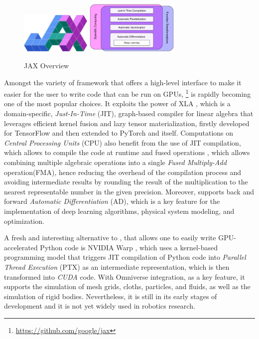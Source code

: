 \begin{figure}[h]
    \centering
    \caption{JAX Overview}
    \label{fig:jax_logo}
    \includegraphics[width=0.3\textwidth]{Images/jax_logo.png} \qquad \qquad
    \includegraphics[width=0.4\textwidth]{Images/JAX-overview.png}
\end{figure}

Amongst the variety of framework that offers a high-level interface to make it easier for the user to write code that can be run on \ac{GPU}s, \jax \footnote{\url{https://github.com/google/jax}} \citep{bradbury_jax_2018,47008} is rapidly becoming one of the most popular choices. It exploits the power of \ac{XLA} \citep{50530}, which is a domain-specific, \textit{Just-In-Time} (\ac{JIT}), graph-based compiler for linear algebra that leverages efficient kernel fusion and lazy tensor materialization, firstly developed for TensorFlow \citep{tensorflow2015-whitepaper} and then extended to PyTorch and \jax itself.
Computations on \textit{Central Processing Units} (\ac{CPU}) also benefit from the use of \ac{JIT} compilation, which allows to compile the code at runtime and fused operations \citep{wang_kernel_2010,snider_operator_2023}, which allows combining multiple algebraic operations into a single \textit{Fused Multiply-Add} operation(\ac{FMA}), hence reducing the overhead of the compilation process and avoiding intermediate results by rounding the result of the multiplication to the nearest representable number in the given precision.
Moreover, \jax supports back and forward \textit{Automatic Differentiation} (\ac{AD}), which is a key feature for the implementation of deep learning algorithms, physical system modeling, and optimization.

A fresh and interesting alternative to \jax, that allows one to easily write \ac{GPU}-accelerated Python code is NVIDIA Warp \citep{warp2022}, which uses a kernel-based programming model that triggers \ac{JIT} compilation of Python code into \textit{Parallel Thread Execution} (\ac{PTX}) as an intermediate representation, which is then transformed into \textit{CUDA} code. With Omniverse integration, as a key feature, it supports the simulation of mesh grids, cloths, particles, and fluids, as well as the simulation of rigid bodies. Nevertheless, it is still in its early stages of development and it is not yet widely used in robotics research.


